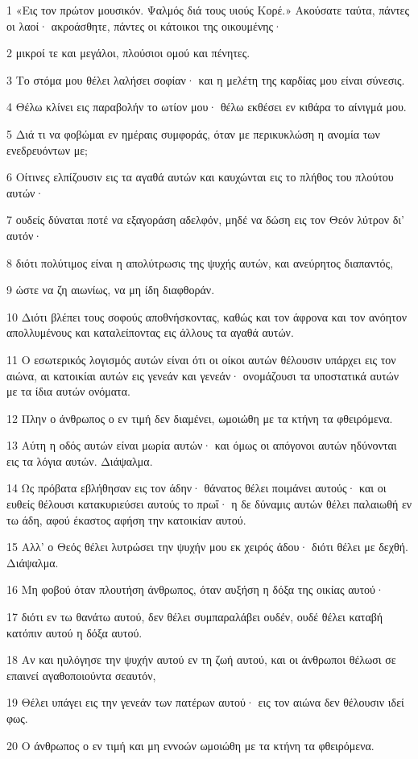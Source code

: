 \par 1 «Εις τον πρώτον μουσικόν. Ψαλμός διά τους υιούς Κορέ.» Ακούσατε ταύτα, πάντες οι λαοί· ακροάσθητε, πάντες οι κάτοικοι της οικουμένης·
\par 2 μικροί τε και μεγάλοι, πλούσιοι ομού και πένητες.
\par 3 Το στόμα μου θέλει λαλήσει σοφίαν· και η μελέτη της καρδίας μου είναι σύνεσις.
\par 4 Θέλω κλίνει εις παραβολήν το ωτίον μου· θέλω εκθέσει εν κιθάρα το αίνιγμά μου.
\par 5 Διά τι να φοβώμαι εν ημέραις συμφοράς, όταν με περικυκλώση η ανομία των ενεδρευόντων με;
\par 6 Οίτινες ελπίζουσιν εις τα αγαθά αυτών και καυχώνται εις το πλήθος του πλούτου αυτών·
\par 7 ουδείς δύναται ποτέ να εξαγοράση αδελφόν, μηδέ να δώση εις τον Θεόν λύτρον δι' αυτόν·
\par 8 διότι πολύτιμος είναι η απολύτρωσις της ψυχής αυτών, και ανεύρητος διαπαντός,
\par 9 ώστε να ζη αιωνίως, να μη ίδη διαφθοράν.
\par 10 Διότι βλέπει τους σοφούς αποθνήσκοντας, καθώς και τον άφρονα και τον ανόητον απολλυμένους και καταλείποντας εις άλλους τα αγαθά αυτών.
\par 11 Ο εσωτερικός λογισμός αυτών είναι ότι οι οίκοι αυτών θέλουσιν υπάρχει εις τον αιώνα, αι κατοικίαι αυτών εις γενεάν και γενεάν· ονομάζουσι τα υποστατικά αυτών με τα ίδια αυτών ονόματα.
\par 12 Πλην ο άνθρωπος ο εν τιμή δεν διαμένει, ωμοιώθη με τα κτήνη τα φθειρόμενα.
\par 13 Αύτη η οδός αυτών είναι μωρία αυτών· και όμως οι απόγονοι αυτών ηδύνονται εις τα λόγια αυτών. Διάψαλμα.
\par 14 Ως πρόβατα εβλήθησαν εις τον άδην· θάνατος θέλει ποιμάνει αυτούς· και οι ευθείς θέλουσι κατακυριεύσει αυτούς το πρωΐ· η δε δύναμις αυτών θέλει παλαιωθή εν τω άδη, αφού έκαστος αφήση την κατοικίαν αυτού.
\par 15 Αλλ' ο Θεός θέλει λυτρώσει την ψυχήν μου εκ χειρός άδου· διότι θέλει με δεχθή. Διάψαλμα.
\par 16 Μη φοβού όταν πλουτήση άνθρωπος, όταν αυξήση η δόξα της οικίας αυτού·
\par 17 διότι εν τω θανάτω αυτού, δεν θέλει συμπαραλάβει ουδέν, ουδέ θέλει καταβή κατόπιν αυτού η δόξα αυτού.
\par 18 Αν και ηυλόγησε την ψυχήν αυτού εν τη ζωή αυτού, και οι άνθρωποι θέλωσι σε επαινεί αγαθοποιούντα σεαυτόν,
\par 19 Θέλει υπάγει εις την γενεάν των πατέρων αυτού· εις τον αιώνα δεν θέλουσιν ιδεί φως.
\par 20 Ο άνθρωπος ο εν τιμή και μη εννοών ωμοιώθη με τα κτήνη τα φθειρόμενα.

